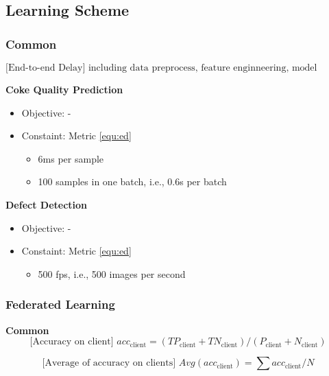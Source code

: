 \subsection{Learning Scheme}

\subsubsection{Common}
\begin{equation} \label{equ:ed} 
\text{[End-to-end Delay] including data preprocess, feature enginneering, model inference etc.} 
\end{equation}

\noindent \textbf{Coke Quality Prediction}
\begin{itemize}
    \item Objective: - 
    \item Constaint: Metric \ref{equ:ed}
        \begin{itemize} 
        \item 6ms per sample 
        \item 100 samples in one batch, i.e., 0.6s per batch
        \end{itemize}
\end{itemize}

\noindent \textbf{Defect Detection}
\begin{itemize}
    \item Objective: - 
    \item Constaint: Metric \ref{equ:ed}
        \begin{itemize} 
        \item 500 fps, i.e., 500 images per second 
        \end{itemize}
\end{itemize}

\subsubsection{Federated Learning}

\textbf{Common}
\begin{equation}
\text{[Accuracy on client] } \label{equ:aoc} 
acc_{\text{client}} = (TP_{\text{client}} + TN_{\text{client}}) / (P_{\text{client}} + N_{\text{client}})    
\end{equation}

\begin{equation} \text{[Average of accuracy on clients] } \label{equ:aoaoc} 
Avg(acc_{\text{client}}) = \sum acc_{\text{client}} / N
\end{equation}

